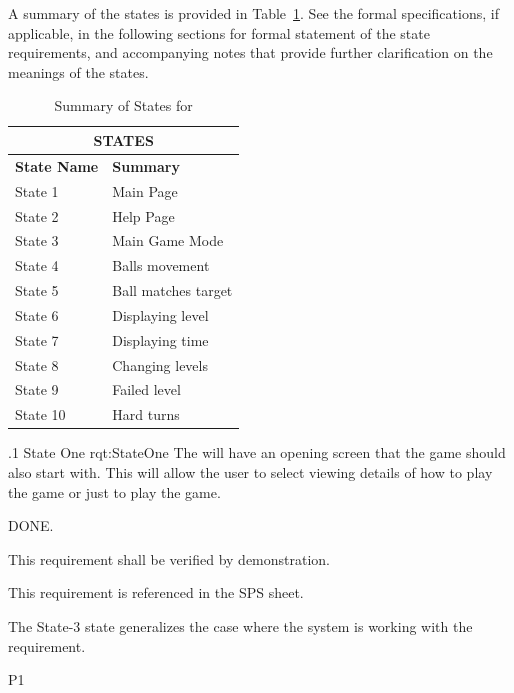 A summary of the states is provided in Table~\ref{tab:States}.
See the formal specifications, if applicable, in the following sections for formal statement of the state requirements, and accompanying notes that provide further clarification on the meanings of the states.


\begin{table}[h]
	\begin{center}
		\begin{tabular}{|p{1.0in}|p{5.0in}|}
			\hline
			\hline
			\multicolumn{2}{|c|}{{\bf STATES}} \\
			\hline
				{\bf State Name} & {\bf Summary} \\
			\hline
			\hline
State 1  &  Main Page  \\ \hline
State 2  &  Help Page  \\ \hline
State 3  &  Main Game Mode   \\ \hline
State 4  &  Balls movement  \\ \hline
State 5  &  Ball matches target  \\ \hline
State 6  &  Displaying level  \\ \hline
State 7  &  Displaying time  \\ \hline
State 8  &  Changing levels  \\ \hline
State 9  &  Failed level   \\ \hline
State 10 &  Hard turns \\ \hline
			\hline
			\hline
		\end{tabular}
		\caption{Summary of States for \ThisSystem}
		\label{tab:States}
	\end{center}
\end{table}


\ONERQMTVKPP
{\RqtNumberBase.1}
{State One}
{rqt:StateOne}
{The \ThisSys will have an opening screen that the game should also start with. This will allow the user to select viewing details of how to play the game or just to play the game.}
{
	\item [Phase 1] DONE.
}
{This requirement shall be verified by demonstration.}
{
	\item [SPS] This requirement is referenced in the SPS sheet.
}
{
	\item The State-3 state generalizes the case where the system is working with the requirement.
}
{P1}


